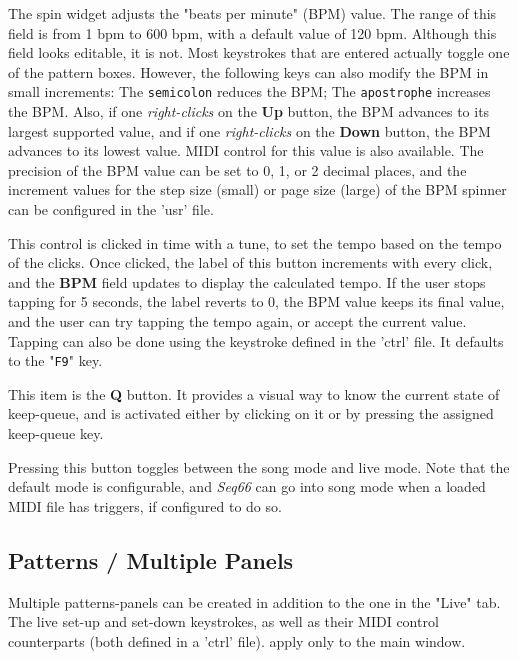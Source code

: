    The spin widget adjusts the "beats per minute" (BPM) value.  The
   range of this field is from 1 bpm to 600 bpm, with a default value of
   120 bpm.
   Although this field looks editable, it is not.  Most keystrokes
   that are entered actually toggle one of the pattern boxes.
   However, the following keys can also modify the BPM in small increments:
   The \texttt{semicolon} reduces the BPM;
   The \texttt{apostrophe} increases the BPM.
   Also, if one \textsl{right-clicks} on the
   \textbf{Up} button, the BPM advances to its largest
   supported value, and if one \textsl{right-clicks} on the
   \textbf{Down} button, the BPM
   advances to its lowest value.
   MIDI control for this value is also available.
   The precision of the BPM value can be set to 0, 1, or 2
   decimal places, and the increment values for the step size (small)
   or page size (large) of the BPM spinner can be configured in the 'usr' file.

   This control is clicked in time with a tune, to set the
   tempo based on the tempo of the clicks.  Once clicked, the label of this
   button increments with every click, and the \textbf{BPM} field updates to
   display the calculated tempo.  If the user stops tapping for 5 seconds, the
   label reverts to 0, the BPM value keeps its final value, and the user can
   try tapping the tempo again, or accept the current value.
   Tapping can also be done using the keystroke defined
   in the 'ctrl' file.
   It defaults to the "\texttt{F9}" key.

   This item is the \textbf{Q} button.
   It provides a visual way to know the current state of keep-queue, and is
   activated either by clicking on it or by pressing the assigned keep-queue
   key.

   Pressing this button toggles between the song mode and live mode.
   Note that the default mode is configurable, and \textsl{Seq66} can go into
   song mode when a loaded MIDI file has triggers, if configured to do so.

\subsection{Patterns / Multiple Panels}
\label{subsec:patterns_panel_multiple}

   Multiple patterns-panels can be created in addition to the one in the "Live"
   tab.  The live set-up and set-down keystrokes, as well as their MIDI control
   counterparts (both defined in a 'ctrl' file).
   apply only to the main window.

